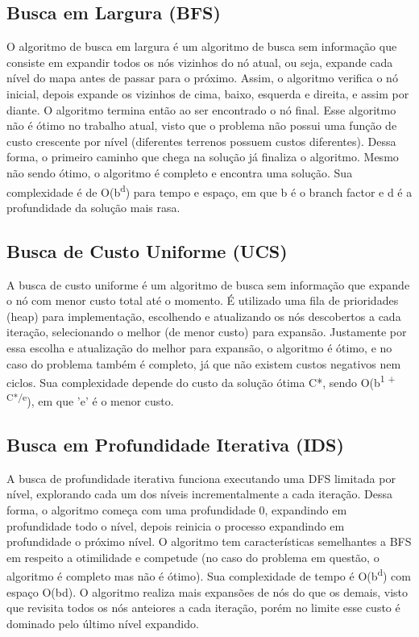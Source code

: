 \documentclass[10pt]{extarticle} %
\begin{document}
\subsection{Busca em Largura (BFS)}

O algoritmo de busca em largura é um algoritmo de busca sem informação que consiste em expandir todos os nós vizinhos do nó atual, ou seja, expande cada nível do mapa antes de passar para o próximo. Assim, o algoritmo verifica o nó inicial, depois expande os vizinhos de cima, baixo, esquerda e direita, e assim por diante. O algoritmo termina então ao ser encontrado o nó final. Esse algoritmo não é ótimo no trabalho atual, visto que o problema não possui uma função de custo crescente por nível (diferentes terrenos possuem custos diferentes). Dessa forma, o primeiro caminho que chega na solução já finaliza o algoritmo. Mesmo não sendo ótimo, o algoritmo é completo e encontra uma solução. Sua complexidade é de O(b\textsuperscript{d}) para tempo e espaço, em que b é o branch factor e d é a profundidade da solução mais rasa.

\subsection{Busca de Custo Uniforme (UCS)}

A busca de custo uniforme é um algoritmo de busca sem informação que expande o nó com menor custo total até o momento. É utilizado uma fila de prioridades (heap) para implementação, escolhendo e atualizando os nós descobertos a cada iteração, selecionando o melhor (de menor custo) para expansão. Justamente por essa escolha e atualização do melhor para expansão, o algoritmo é ótimo, e no caso do problema também é completo, já que não existem custos negativos nem ciclos. Sua complexidade depende do custo da solução ótima C*, sendo O(b\textsuperscript{1 + C*/e}), em que 'e' é o menor custo.

\subsection{Busca em Profundidade Iterativa (IDS)}

A busca de profundidade iterativa funciona executando uma DFS limitada por nível, explorando cada um dos níveis incrementalmente a cada iteração. Dessa forma, o algoritmo começa com uma profundidade 0, expandindo em profundidade todo o nível, depois reinicia o processo expandindo em profundidade o próximo nível. O algoritmo tem características semelhantes a BFS em respeito a otimilidade e competude (no caso do problema em questão, o algoritmo é completo mas não é ótimo). Sua complexidade de tempo é O(b\textsuperscript{d}) com espaço O(bd). O algoritmo realiza mais expansões de nós do que os demais, visto que revisita todos os nós anteiores a cada iteração, porém no limite esse custo é dominado pelo último nível expandido.
\end{document}
